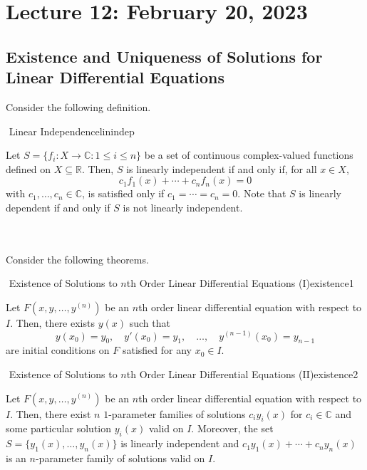\section{Lecture 12: February 20, 2023}

    \subsection{Existence and Uniqueness of Solutions for Linear Differential Equations}

        Consider the following definition.
        \begin{theorem}{\Stop\,\,Linear Independence}{linindep}

            Let \(S=\{f_i:X\to\mathbb{C}:1\leq i\leq n\}\) be a set of continuous complex-valued functions defined on \(X\subseteq\mathbb{R}\). Then, \(S\) is linearly independent if and only if, for all \(x\in X\), 
            \begin{equation*}
                c_1f_1(x)+\cdots+c_nf_n(x)=0
            \end{equation*}
            with \(c_1,\ldots,c_n\in\mathbb{C}\), is satisfied only if \(c_1=\cdots=c_n=0\). Note that \(S\) is linearly dependent if and only if \(S\) is not linearly independent.
            
        \end{theorem}
        \vphantom
        \\
        \\
        Consider the following theorems.
        \begin{theorem}{\Stop\,\,Existence of Solutions to \(n\)th Order Linear Differential Equations (I)}{existence1}
            
            Let \(F(x,y,\ldots,y^{(n)})\) be an \(n\)th order linear differential equation with respect to \(I\). Then, there exists \(y(x)\) such that
            \begin{equation*}
                y(x_0)=y_0,\quad y'(x_0)=y_1,\quad \ldots,\quad y^{(n-1)}(x_0)=y_{n-1}
            \end{equation*}
            are initial conditions on \(F\) satisfied for any \(x_0\in I\).

        \end{theorem}
        \begin{theorem}{\Stop\,\,Existence of Solutions to \(n\)th Order Linear Differential Equations (II)}{existence2}
            
            Let \(F(x,y,\ldots,y^{(n)})\) be an \(n\)th order linear differential equation with respect to \(I\). Then, there exist \(n\) \(1\)-parameter families of solutions \(c_iy_i(x)\) for \(c_i\in\mathbb{C}\) and some particular solution \(y_i(x)\) valid on \(I\). Moreover, the set \(S=\{y_1(x),\ldots,y_n(x)\}\) is linearly independent and \(c_1y_1(x)+\cdots+c_ny_n(x)\) is an \(n\)-parameter family of solutions valid on \(I\).

        \end{theorem}
